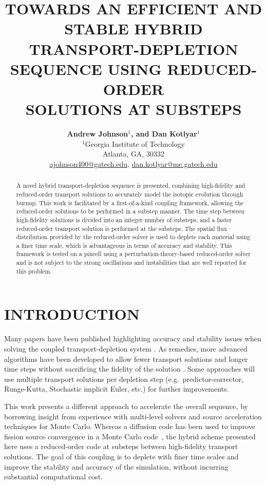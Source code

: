 \documentclass[letterpaper]{mc2021}
\title{TOWARDS AN EFFICIENT AND STABLE HYBRID\\
    TRANSPORT-DEPLETION SEQUENCE USING REDUCED-ORDER\\
    SOLUTIONS AT SUBSTEPS%
}
\author{%
    \textbf{Andrew Johnson\( ^1 \), and Dan Kotlyar\( ^1 \)} \\
    \(^1\)Georgia Institute of Technology \\
    Atlanta, GA, 30332 \\
    \url{ajohnson400@gatech.edu}, \url{dan.kotlyar@me.gatech.edu}
}
\begin{document}
\maketitle
\justify%

\begin{abstract}
    A novel hybrid transport-depletion sequence is presented, combining
    high-fidelity and reduced-order transport solutions to accurately model the
    isotopic evolution through burnup. This work is facilitated by a first-of-a-kind
    coupling framework, allowing the reduced-order solutions to be performed in a
    substep manner. The time step between high-fidelity solutions is divided into
    an integer number of substeps, and a faster reduced-order transport solution is
    performed at the substeps. The spatial flux distribution provided by the reduced-order
    solver is used to deplete each material using a finer time scale, which is advantageous
    in terms of accuracy and stability. This framework is tested on a pincell using
    a perturbation-theory-based reduced-order solver and is not subject to the strong
    oscillations and instabilities that are well reported for this problem.
\end{abstract}


\section{INTRODUCTION}

Many papers have been published highlighting accuracy and stability issues
when solving the coupled transport-depletion system
\cite{Kotlyar2013UsePredictorCorrector,Densmore2013StabilityAnalysisBurnup,Josey2017HigherOrderMethods}.
As remedies, more advanced algorithms have been developed to allow fewer
transport solutions and longer time steps without sacrificing the fidelity of the
solution
\cite{Dufek2013StochasticImplicitEuler,Isotalo2011HigherOrderMethods}.
Some approaches will use multiple transport
solutions per depletion step (e.g.~predictor-corrector, Runge-Kutta,
Stochastic implicit Euler, etc.) for further
improvements.

This work presents a different approach to accelerate the overall sequence, by
borrowing insight from experience with multi-level solvers and source acceleration
techniques for Monte Carlo.
Whereas a diffusion code has been used to improve fission
source convergence in a Monte Carlo code~\cite{Lee2014CoarseMeshFinite},
the hybrid scheme presented here uses a reduced-order code at substeps
between high-fidelity transport solutions.
The goal of this coupling is to deplete with finer time scales and improve the
stability and accuracy of the simulation, without incurring substantial
computational cost.
\end{document}
